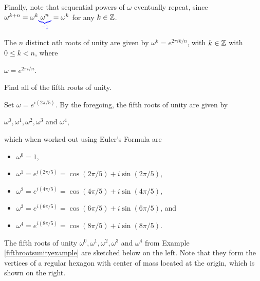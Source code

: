 \documentclass[11pt,fleqn,dvipsnames,usenames]{article}
\newcommand{\p}{\noindent}
\begin{document}
\p Finally, note that sequential powers of $\omega$ eventually repeat, since $\omega^{k+n} = \omega^{k}{\color{blue}\underbrace{\color{black}\omega^{n}}_{=1}} = \omega^{k}$ for any $k\in\mathbb{Z}$.
%
\begin{theorem}\label{rootsofunityclassification}
The $n$ distinct $n$th roots of unity are given by $\omega^{k} = e^{2\pi i k/n}$, with $k\in\mathbb{Z}$ with $0\leq k < n$, where
\begin{center}
$\omega = e^{2\pi i/n}$.
\end{center}
\end{theorem}


\begin{example}\label{fifthrootsunityexample}
Find all of the fifth roots of unity.
\end{example}
%
\begin{solution}
Set $\omega = e^{i(2\pi/5)}$.  By the foregoing, the fifth roots of unity are given by
\begin{center}
$\omega^{0}, \omega^{1}, \omega^{2},\omega^{3}$ and $\omega^{4}$,
\end{center}
which when worked out using Euler's Formula are
\begin{itemize}[\ ]
\item $\omega^{0} = 1$,
\item $\omega^{1} = e^{i(2\pi/5)} = \cos(2\pi/5) + i\sin(2\pi/5)$,
\item $\omega^{2} = e^{i(4\pi/5)} = \cos(4\pi/5) + i\sin(4\pi/5)$,
\item $\omega^{3} = e^{i(6\pi/5)} = \cos(6\pi/5) + i\sin(6\pi/5)$, and
\item $\omega^{4} = e^{i(8\pi/5)} = \cos(8\pi/5) + i\sin(8\pi/5)$.
\end{itemize}
\end{solution}
\vsp

\p The fifth roots of unity $\omega^{0}, \omega^{1}, \omega^{2},\omega^{3}$ and $\omega^{4}$ from Example \ref{fifthrootsunityexample} are sketched below on the left.  Note that they form the vertices of a regular hexagon with center of mass located at the origin, which is shown on the right.
\end{document}
